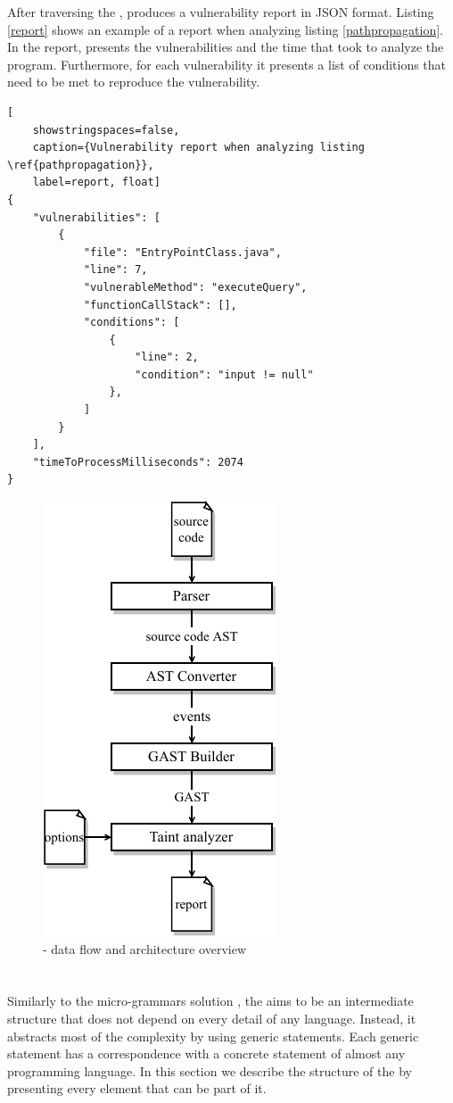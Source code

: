 After traversing the \astname{}, \toolname{} produces a vulnerability report in JSON format. Listing \ref{report} shows an example of a report when analyzing listing \ref{pathpropagation}. In the report, \toolname{} presents the vulnerabilities and the time that took to analyze the program. Furthermore, for each vulnerability it presents a list of conditions that need to be met to reproduce the vulnerability. 

\begin{lstlisting}[
    showstringspaces=false,
    caption={Vulnerability report when analyzing listing \ref{pathpropagation}},
    label=report, float]
{
    "vulnerabilities": [
        {
            "file": "EntryPointClass.java",
            "line": 7,
            "vulnerableMethod": "executeQuery",
            "functionCallStack": [],
            "conditions": [
                {
                    "line": 2,
                    "condition": "input != null"
                },
            ]
        }
    ],
    "timeToProcessMilliseconds": 2074
}
\end{lstlisting}


\begin{figure}[hbt!]
    \centering
    \includegraphics[width =0.4\linewidth]{images/yasat-architecture.pdf}
    \caption{\toolname{} - data flow and architecture overview} 
    \label{architecture}
\end{figure}

\section{\astname{}}
\label{genericast}
Similarly to the micro-grammars solution \cite{microgrammars}, the \astname{} aims to be an intermediate structure that does not depend on every detail of any language. Instead, it abstracts most of the complexity by using generic statements. Each generic statement has a correspondence with a concrete statement of almost any programming language. In this section we describe the structure of the \astname{} by presenting every element that can be part of it. 

